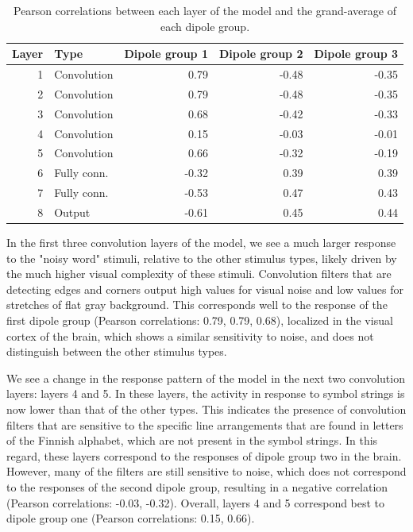 \documentclass[a4paper, 10pt]{vanvliet_paper}
\begin{document}
\begin{table}[b]
    \begin{tabular}{rlrrr}
        \toprule
        Layer & Type        & Dipole group 1 & Dipole group 2 & Dipole group 3 \\
        \midrule
            1 & Convolution &           0.79 &          -0.48 &          -0.35 \\
            2 & Convolution &           0.79 &          -0.48 &          -0.35 \\
            3 & Convolution &           0.68 &          -0.42 &          -0.33 \\
            4 & Convolution &           0.15 &          -0.03 &          -0.01 \\
            5 & Convolution &           0.66 &          -0.32 &          -0.19 \\
            6 & Fully conn. &          -0.32 &           0.39 &           0.39 \\
            7 & Fully conn. &          -0.53 &           0.47 &           0.43 \\
            8 & Output      &          -0.61 &           0.45 &           0.44 \\
        \bottomrule
    \end{tabular}
    \caption{Pearson correlations between each layer of the model and the grand-average of each dipole group.}\label{tab:correlations}
\end{table}

In the first three convolution layers of the model, we see a much larger response to the "noisy word" stimuli, relative to the other stimulus types, likely driven by the much higher visual complexity of these stimuli.
Convolution filters that are detecting edges and corners output high values for visual noise and low values for stretches of flat gray background.
This corresponds well to the response of the first dipole group (Pearson correlations: 0.79, 0.79, 0.68), localized in the visual cortex of the brain, which shows a similar sensitivity to noise, and does not distinguish between the other stimulus types.

We see a change in the response pattern of the model in the next two convolution layers: layers 4 and 5.
In these layers, the activity in response to symbol strings is now lower than that of the other types.
This indicates the presence of convolution filters that are sensitive to the specific line arrangements that are found in letters of the Finnish alphabet, which are not present in the symbol strings.
In this regard, these layers correspond to the responses of dipole group two in the brain.
However, many of the filters are still sensitive to noise, which does not correspond to the responses of the second dipole group, resulting in a negative correlation (Pearson correlations: -0.03, -0.32).
Overall, layers 4 and 5 correspond best to dipole group one (Pearson correlations: 0.15, 0.66).
\end{document}
